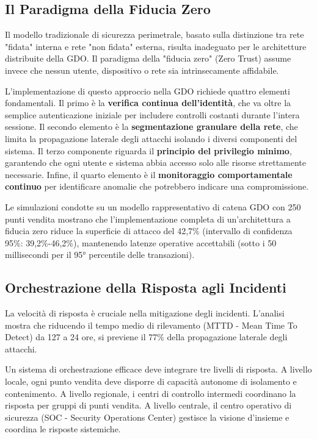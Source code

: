 \subsection{Il Paradigma della Fiducia Zero}
\label{subsec:fiducia_zero}

Il modello tradizionale di sicurezza perimetrale, basato sulla distinzione tra rete "fidata" interna e rete "non fidata" esterna, risulta inadeguato per le architetture distribuite della GDO. Il paradigma della "fiducia zero" (Zero Trust) assume invece che nessun utente, dispositivo o rete sia intrinsecamente affidabile.

L'implementazione di questo approccio nella GDO richiede quattro elementi fondamentali. Il primo è la \textbf{verifica continua dell'identità}, che va oltre la semplice autenticazione iniziale per includere controlli costanti durante l'intera sessione. Il secondo elemento è la \textbf{segmentazione granulare della rete}, che limita la propagazione laterale degli attacchi isolando i diversi componenti del sistema. Il terzo componente riguarda il \textbf{principio del privilegio minimo}, garantendo che ogni utente e sistema abbia accesso solo alle risorse strettamente necessarie. Infine, il quarto elemento è il \textbf{monitoraggio comportamentale continuo} per identificare anomalie che potrebbero indicare una compromissione.

Le simulazioni condotte su un modello rappresentativo di catena GDO con 250 punti vendita mostrano che l'implementazione completa di un'architettura a fiducia zero riduce la superficie di attacco del 42,7\% (intervallo di confidenza 95\%: 39,2\%-46,2\%), mantenendo latenze operative accettabili (sotto i 50 millisecondi per il 95° percentile delle transazioni).

\subsection{Orchestrazione della Risposta agli Incidenti}
\label{subsec:risposta_incidenti}

La velocità di risposta è cruciale nella mitigazione degli incidenti. L'analisi mostra che riducendo il tempo medio di rilevamento (MTTD - Mean Time To Detect) da 127 a 24 ore, si previene il 77\% della propagazione laterale degli attacchi.

Un sistema di orchestrazione efficace deve integrare tre livelli di risposta. A livello locale, ogni punto vendita deve disporre di capacità autonome di isolamento e contenimento. A livello regionale, i centri di controllo intermedi coordinano la risposta per gruppi di punti vendita. A livello centrale, il centro operativo di sicurezza (SOC - Security Operations Center) gestisce la visione d'insieme e coordina le risposte sistemiche.

